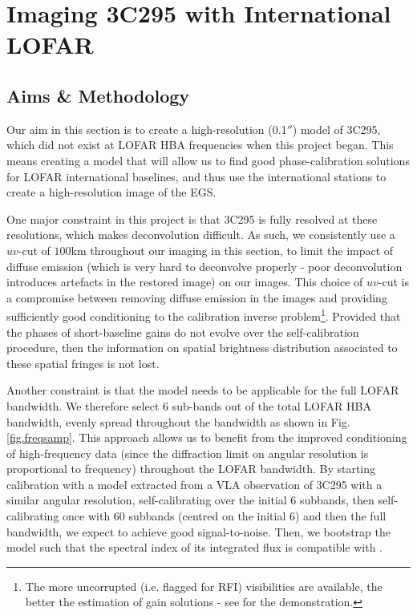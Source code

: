 \chapter{Imaging 3C295 with International LOFAR}\label{section.3c295}
\minitoc
\section{Aims \& Methodology}
\pg
Our aim in this section is to create a high-resolution (0.1$''$) model of 3C295, which did not exist at LOFAR HBA frequencies when this project began. This means creating a model that will allow us to find good phase-calibration solutions for LOFAR international baselines, and thus use the international stations to create a high-resolution image of the EGS.

\pg
One major constraint in this project is that 3C295 is fully resolved at these resolutions, which makes deconvolution difficult. As such, we consistently use a $uv$-cut of $100$km throughout our imaging in this section, to limit the impact of diffuse emission (which is very hard to deconvolve properly - poor deconvolution introduces artefacts in the restored image) on our images. This choice of $uv$-cut is a compromise between removing diffuse emission in the images and providing sufficiently good conditioning to the calibration inverse problem\footnote{The more uncorrupted (i.e. flagged for RFI) visibilities are available, the better the estimation of gain solutions - see  for the demonstration.}. Provided that the phases of short-baseline gains do not evolve over the self-calibration procedure, then the information on spatial brightness distribution associated to these spatial fringes is not lost. 

\pg
Another constraint is that the model needs to be applicable for the full LOFAR bandwidth. We therefore select 6 sub-bands out of the total LOFAR HBA bandwidth, evenly spread throughout the bandwidth as shown in Fig. \ref{fig.freqsamp}. This approach allows us to benefit from the improved conditioning of high-frequency data (since the diffraction limit on angular resolution is proportional to frequency) throughout the LOFAR bandwidth. By starting calibration with a model extracted from a VLA observation of 3C295 with a similar angular resolution, self-calibrating over the initial 6 subbands, then self-calibrating once with 60 subbands (centred on the initial 6) and then the full bandwidth, we expect to achieve good signal-to-noise. Then, we bootstrap the model such that the spectral index of its integrated flux is compatible with .

